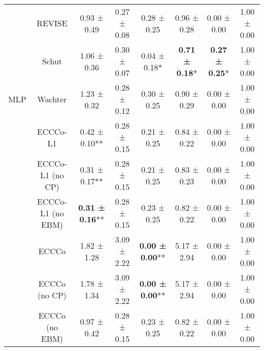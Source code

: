 \begin{table}
{\begin{tabular}[t]{cccccccc}
 & REVISE & 0.93 ± 0.49\hphantom{*}\hphantom{*} & 0.27 ± 0.08\hphantom{*}\hphantom{*} & 0.28 ± 0.25\hphantom{*}\hphantom{*} & 0.96 ± 0.28\hphantom{*}\hphantom{*} & 0.00 ± 0.00\hphantom{*}\hphantom{*} & 1.00 ± 0.00\hphantom{*}\hphantom{*}\\

 & Schut & 1.06 ± 0.36\hphantom{*}\hphantom{*} & 0.30 ± 0.07\hphantom{*}\hphantom{*} & 0.04 ± 0.18*\hphantom{*} & \textbf{0.71 ± 0.18}*\hphantom{*} & \textbf{0.27 ± 0.25}*\hphantom{*} & 1.00 ± 0.00\hphantom{*}\hphantom{*}\\

\multirow[t]{-9}{*}{\centering\arraybackslash MLP} & Wachter & 1.23 ± 0.32\hphantom{*}\hphantom{*} & 0.28 ± 0.12\hphantom{*}\hphantom{*} & 0.30 ± 0.25\hphantom{*}\hphantom{*} & 0.90 ± 0.29\hphantom{*}\hphantom{*} & 0.00 ± 0.00\hphantom{*}\hphantom{*} & 1.00 ± 0.00\hphantom{*}\hphantom{*}\\
\cmidrule{1-8}
 & ECCCo-L1 & 0.42 ± 0.10** & 0.28 ± 0.15\hphantom{*}\hphantom{*} & 0.21 ± 0.25\hphantom{*}\hphantom{*} & 0.84 ± 0.22\hphantom{*}\hphantom{*} & 0.00 ± 0.00\hphantom{*}\hphantom{*} & 1.00 ± 0.00\hphantom{*}\hphantom{*}\\

 & ECCCo-L1 (no CP) & 0.31 ± 0.17** & 0.28 ± 0.15\hphantom{*}\hphantom{*} & 0.21 ± 0.25\hphantom{*}\hphantom{*} & 0.83 ± 0.23\hphantom{*}\hphantom{*} & 0.00 ± 0.00\hphantom{*}\hphantom{*} & 1.00 ± 0.00\hphantom{*}\hphantom{*}\\

 & ECCCo-L1 (no EBM) & \textbf{0.31 ± 0.16}** & 0.28 ± 0.15\hphantom{*}\hphantom{*} & 0.23 ± 0.25\hphantom{*}\hphantom{*} & 0.82 ± 0.22\hphantom{*}\hphantom{*} & 0.00 ± 0.00\hphantom{*}\hphantom{*} & 1.00 ± 0.00\hphantom{*}\hphantom{*}\\

 & ECCCo & 1.82 ± 1.28\hphantom{*}\hphantom{*} & 3.09 ± 2.22\hphantom{*}\hphantom{*} & \textbf{0.00 ± 0.00}** & 5.17 ± 2.94\hphantom{*}\hphantom{*} & 0.00 ± 0.00\hphantom{*}\hphantom{*} & 1.00 ± 0.00\hphantom{*}\hphantom{*}\\

 & ECCCo (no CP) & 1.78 ± 1.34\hphantom{*}\hphantom{*} & 3.09 ± 2.22\hphantom{*}\hphantom{*} & \textbf{0.00 ± 0.00}** & 5.17 ± 2.94\hphantom{*}\hphantom{*} & 0.00 ± 0.00\hphantom{*}\hphantom{*} & 1.00 ± 0.00\hphantom{*}\hphantom{*}\\

 & ECCCo (no EBM) & 0.97 ± 0.42\hphantom{*}\hphantom{*} & 0.28 ± 0.15\hphantom{*}\hphantom{*} & 0.23 ± 0.25\hphantom{*}\hphantom{*} & 0.82 ± 0.22\hphantom{*}\hphantom{*} & 0.00 ± 0.00\hphantom{*}\hphantom{*} & 1.00 ± 0.00\hphantom{*}\hphantom{*}\\


\end{tabular}}
\end{table}
